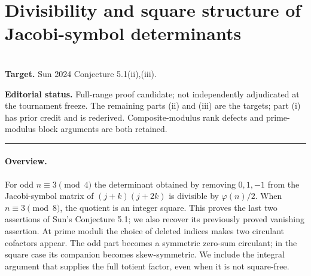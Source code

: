 \documentclass[11pt,a4paper]{article}
\begin{document}
\clearpage

\section{Divisibility and square structure of Jacobi-symbol determinants}
\label{section:R21R}
\\[3pt]
\noindent\textbf{Target.} Sun 2024 Conjecture 5.1(ii),(iii).

\noindent\textbf{Editorial status.} Full-range proof candidate; not independently adjudicated at the tournament freeze. The remaining parts (ii) and (iii) are the targets; part (i) has prior credit and is rederived. Composite-modulus rank defects and prime-modulus block arguments are both retained.

\smallskip\hrule\medskip



\begingroup
\newcommand{\Z}{\mathbb Z}
\newcommand{\F}{\mathbb F}
\newcommand{\adj}{\operatorname{adj}}
\newcommand{\cof}{\operatorname{cof}}
\setcounter{equation}{0}
\renewcommand{\theequation}{\thesection.\arabic{equation}}
\renewcommand{\theHequation}{R21R.\arabic{equation}}
\paragraph{Overview.}
For odd $n\equiv3\pmod4$ the determinant obtained by removing $0,1,-1$ from the Jacobi-symbol matrix of $(j+k)(j+2k)$ is divisible by $\varphi(n)/2$. When $n\equiv3\pmod8$, the quotient is an integer square. This proves the last two assertions of Sun's Conjecture 5.1; we also recover its previously proved vanishing assertion. At prime moduli the choice of deleted indices makes two circulant cofactors appear. The odd part becomes a symmetric zero-sum circulant; in the square case its companion becomes skew-symmetric. We include the integral argument that supplies the full totient factor, even when it is not square-free.
\end{document}
